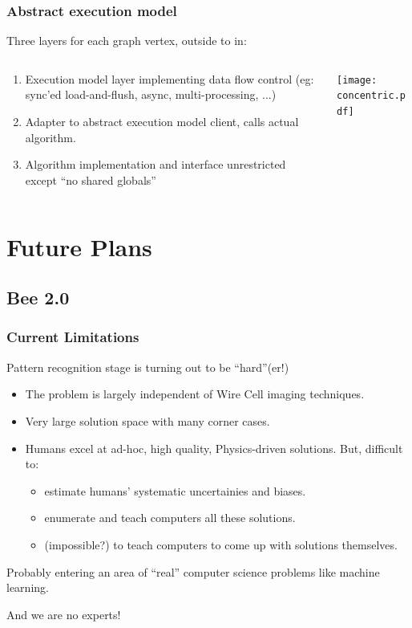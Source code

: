 \documentclass[xcolor=dvipsnames]{beamer}
\begin{document}
\begin{frame}
  \frametitle{Abstract execution model}
  Three layers for each graph vertex, outside to in:
  
  \begin{columns}
    \begin{column}{0.6\textwidth}
      \begin{enumerate}
      \item Execution model layer implementing data flow control
        (eg: sync'ed load-and-flush, async, multi-processing, ...)
      \item Adapter to abstract execution model client, calls actual algorithm.
      \item Algorithm implementation and interface unrestricted except ``no shared
        globals'' 
      \end{enumerate}
    \end{column}
    \begin{column}{0.4\textwidth}
      \texttt{[image: concentric.pdf]}      
    \end{column}
  \end{columns}

\end{frame}

\section{Future Plans}

\begin{frame}
\end{frame}

\subsection{Bee 2.0}

\begin{frame}
  \frametitle{Current Limitations}
  Pattern recognition stage is turning out to be ``hard''(er!)
  \begin{itemize}
  \item The problem is largely independent of Wire Cell imaging techniques.
  \item Very large solution space with many corner cases.
  \item Humans excel at ad-hoc, high quality, Physics-driven solutions.  But, difficult to:
    \begin{itemize}
    \item estimate humans' systematic uncertainies and biases.
    \item enumerate and teach computers all these solutions.
    \item (impossible?) to teach computers to come up with
      solutions themselves.
    \end{itemize}
  \end{itemize}
  
  Probably entering an area of ``real'' computer science problems like machine learning.  

  And we are no experts!

\end{frame}
\end{document}
